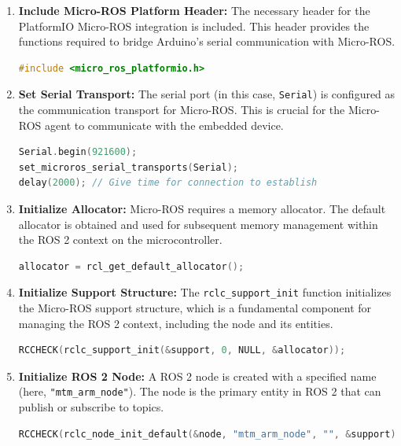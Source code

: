 \begin{enumerate}
    \item \textbf{Include Micro-ROS Platform Header:}
    The necessary header for the PlatformIO Micro-ROS integration is included. This header provides the functions required to bridge Arduino's serial communication with Micro-ROS.
\begin{lstlisting}[language=C++, caption={Include Micro-ROS PlatformIO Header}, label={lst:microros_include}]
#include <micro_ros_platformio.h>
\end{lstlisting}

    \item \textbf{Set Serial Transport:}
    The serial port (in this case, \texttt{Serial}) is configured as the communication transport for Micro-ROS. This is crucial for the Micro-ROS agent to communicate with the embedded device.
\begin{lstlisting}[language=C++, caption={Set Micro-ROS Serial Transport}, label={lst:microros_serial_transport}]
Serial.begin(921600);
set_microros_serial_transports(Serial);
delay(2000); // Give time for connection to establish
\end{lstlisting}

    \item \textbf{Initialize Allocator:}
    Micro-ROS requires a memory allocator. The default allocator is obtained and used for subsequent memory management within the ROS 2 context on the microcontroller.
\begin{lstlisting}[language=C++, caption={Initialize Micro-ROS Allocator}, label={lst:microros_allocator}]
allocator = rcl_get_default_allocator();
\end{lstlisting}

    \item \textbf{Initialize Support Structure:}
    The \texttt{rclc\_support\_init} function initializes the Micro-ROS support structure, which is a fundamental component for managing the ROS 2 context, including the node and its entities.
\begin{lstlisting}[language=C++, caption={Initialize Micro-ROS Support Structure}, label={lst:microros_support_init}]
RCCHECK(rclc_support_init(&support, 0, NULL, &allocator));
\end{lstlisting}

    \item \textbf{Initialize ROS 2 Node:}
    A ROS 2 node is created with a specified name (here, \texttt{"mtm\_arm\_node"}). The node is the primary entity in ROS 2 that can publish or subscribe to topics.
\begin{lstlisting}[language=C++, caption={Initialize ROS 2 Node}, label={lst:microros_node_init}]
RCCHECK(rclc_node_init_default(&node, "mtm_arm_node", "", &support));
\end{lstlisting}


\end{enumerate}
